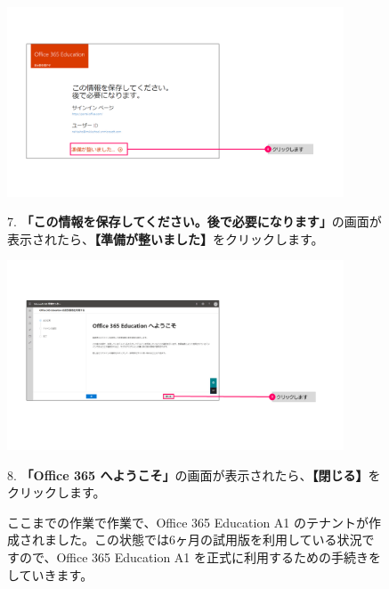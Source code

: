 \begin{figure}[h]
    \begin{minipage}{0.6\textwidth}
        \includegraphics[width=10cm]{figures/O365A1_submission06.png}
    \end{minipage}
    \begin{minipage}{0.4\textwidth}
       7. \textbf{「この情報を保存してください。後で必要になります」}の画面が表示されたら、\textbf{【準備が整いました】}をクリックします。
    \end{minipage}
\end{figure}

\begin{figure}[h]
    \begin{minipage}{0.6\textwidth}
        \includegraphics[width=10cm]{figures/O365A1_submission07.png}
    \end{minipage}
    \begin{minipage}{0.4\textwidth}
       8. \textbf{「Office 365 へようこそ」}の画面が表示されたら、\textbf{【閉じる】}をクリックします。
    \end{minipage}
\end{figure}

\begin{figure}[h]
    \begin{minipage}{1.0\textwidth}
        ここまでの作業で作業で、Office 365 Education A1 のテナントが作成されました。この状態では6ヶ月の試用版を利用している状況ですので、Office 365 Education A1 を正式に利用するための手続きをしていきます。
    \end{minipage}
\end{figure}

